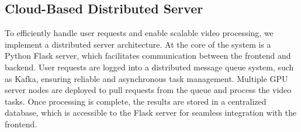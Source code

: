 



\subsection{Cloud-Based Distributed Server}
To efficiently handle user requests and enable scalable video processing, we implement a distributed server architecture. At the core of the system is a Python Flask server, which facilitates communication between the frontend and backend. User requests are logged into a distributed message queue system, such as Kafka, ensuring reliable and asynchronous task management.
Multiple GPU server nodes are deployed to pull requests from the queue and process the video tasks. Once processing is complete, the results are stored in a centralized database, which is accessible to the Flask server for seamless integration with the frontend.

